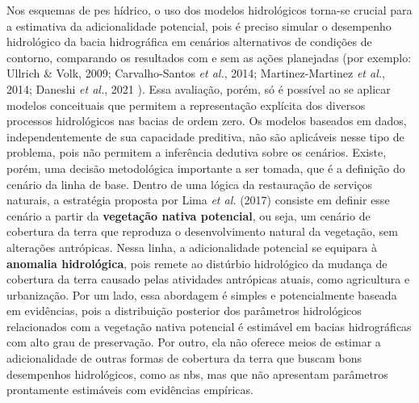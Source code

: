 \documentclass[./main.tex]{subfiles}
\begin{document}
\par Nos esquemas de \acrshort{pes} hídrico, o uso dos modelos hidrológicos torna-se crucial para a estimativa da adicionalidade potencial, pois é preciso simular o desempenho hidrológico da bacia hidrográfica em cenários alternativos de condições de contorno, comparando os resultados com e sem as ações planejadas (por exemplo: Ullrich \& Volk, 2009; Carvalho-Santos \textit{et al.}, 2014; Martinez-Martinez \textit{et al.}, 2014; Daneshi \textit{et al.}, 2021 \cite{Ullrich2009a, Carvalho-santos2014a, Martinez-martinez2014a, Daneshi2021a}). Essa avaliação, porém, só é possível ao se aplicar modelos conceituais que permitem a representação explícita dos diversos processos hidrológicos nas bacias de ordem zero. Os modelos baseados em dados, independentemente de sua capacidade preditiva, não são aplicáveis nesse tipo de problema, pois não permitem a inferência dedutiva sobre os cenários. Existe, porém, uma decisão metodológica importante a ser tomada, que é a definição do cenário da linha de base. Dentro de uma lógica da restauração de serviços naturais, a estratégia proposta por Lima \textit{et al.} (2017) \cite{Lima2017} consiste em definir esse cenário a partir da \textbf{vegetação nativa potencial}, ou seja, um cenário de cobertura da terra que reproduza o desenvolvimento natural da vegetação, sem alterações antrópicas. Nessa linha, a adicionalidade potencial se equipara à \textbf{anomalia hidrológica}, pois remete ao distúrbio hidrológico da mudança de cobertura da terra causado pelas atividades antrópicas atuais, como agricultura e urbanização. Por um lado, essa abordagem é simples e potencialmente baseada em evidências, pois a distribuição posterior dos parâmetros hidrológicos relacionados com a vegetação nativa potencial é estimável em bacias hidrográficas com alto grau de preservação. Por outro, ela não oferece meios de estimar a adicionalidade de outras formas de cobertura da terra que buscam bons desempenhos hidrológicos, como as \acrshort{nbs}, mas que não apresentam parâmetros prontamente estimáveis com evidências empíricas.   
\end{document}

